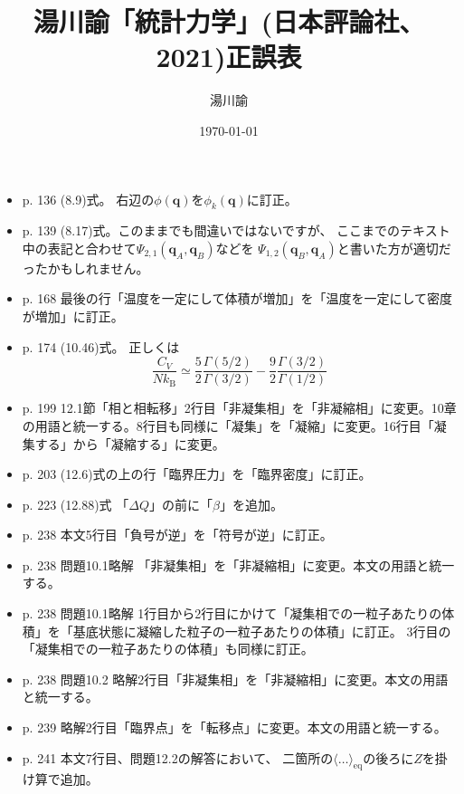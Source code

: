 \documentclass[dvipdfmx,uplatex]{jsarticle}
\begin{document}
\title{湯川諭「統計力学」(日本評論社、2021)正誤表}
\author{湯川諭}
\date{\today}
\maketitle
\begin{itemize}
\item
p. 136 (8.9)式。
右辺の$\phi(\boldsymbol{q})$を$\phi_{k}(\boldsymbol{q})$に訂正。
\item
p. 139 (8.17)式。このままでも間違いではないですが、
ここまでのテキスト中の表記と合わせて$\Psi_{2,1}(\boldsymbol{q}_{A}, \boldsymbol{q}_{B})$などを
$\Psi_{1,2}(\boldsymbol{q}_{B}, \boldsymbol{q}_{A})$と書いた方が適切だったかもしれません。
\item
p. 168 最後の行「温度を一定にして体積が増加」を「温度を一定にして密度が増加」に訂正。
\item
p. 174 (10.46)式。
正しくは
\[
 \dfrac{C_V}{N k_\mathrm{B}}\simeq
 \dfrac{5}{2} \dfrac{\Gamma(5/2)}{\Gamma(3/2)} -
 \dfrac{9}{2} \dfrac{\Gamma(3/2)}{\Gamma(1/2)}
\]
\item
p. 199 12.1節「相と相転移」2行目「非凝集相」を「非凝縮相」に変更。10章の用語と統一する。8行目も同様に「凝集」を「凝縮」に変更。16行目「凝集する」から「凝縮する」に変更。
\item
p. 203 (12.6)式の上の行「臨界圧力」を「臨界密度」に訂正。
\item
p. 223 (12.88)式 「$\Delta Q$」の前に「$\beta$」を追加。
\item
p. 238 本文5行目「負号が逆」を「符号が逆」に訂正。
\item 
p. 238 問題10.1略解 「非凝集相」を「非凝縮相」に変更。本文の用語と統一する。
\item
p. 238 問題10.1略解 1行目から2行目にかけて「凝集相での一粒子あたりの体積」を「基底状態に凝縮した粒子の一粒子あたりの体積」に訂正。
3行目の「凝集相での一粒子あたりの体積」も同様に訂正。
\item
p. 238 問題10.2 略解2行目「非凝集相」を「非凝縮相」に変更。本文の用語と統一する。
\item
p. 239 略解2行目「臨界点」を「転移点」に変更。本文の用語と統一する。
\item
p. 241 本文7行目、問題12.2の解答において、 二箇所の$\langle \dots \rangle_{\mathrm{eq}}$の後ろに$Z$を掛け算で追加。
\end{itemize}
\end{document}
